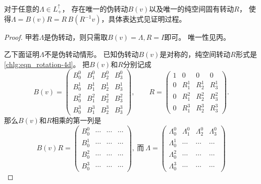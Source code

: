 \begin{theorem} 
    对于任意的$ \Lambda \in L^{\uparrow}_{+}$，
    存在唯一的伪转动$B(v)$以及唯一的纯空间固有转动$R$，
    使得$\Lambda = B(v) R = R\,B(R^{-1}v)$，具体表达式见证明过程。
\end{theorem}
\begin{proof}
    甲若$\Lambda$是伪转动，则只需取$B(v)=\Lambda,R=I$即可。
    唯一性见丙。

    乙下面证明$\Lambda$不是伪转动情形。
    已知伪转动$B(v)$是对称的，纯空间转动$R$形式是\eqref{chlg:eqn_rotation-4d}。
    把$B(v)$和$R$分别记成
    \begin{equation}
        B(v) = \begin{pmatrix}
            B^0_{0}  & B^0_{1} & B^0_{2} & B^0_{3} \\
            B^1_{0}  & B^1_{1} & B^1_{2} & B^1_{3} \\
            B^2_{0}  & B^2_{1} & B^2_{2} & B^2_{3} \\
            B^3_{0}  & B^3_{1} & B^3_{2} & B^3_{3}
        \end{pmatrix}, \qquad
        R = \begin{pmatrix}
            1    & 0 & 0 & 0 \\
            0 & R^1_{1} & R^1_{2} & R^1_{3} \\
            0 & R^2_{1} & R^2_{2} & R^2_{3} \\
            0 & R^3_{1} & R^3_{2} & R^3_{3}
        \end{pmatrix}.
    \end{equation}
    那么$B(v)$和$R$相乘的第一列是
    \begin{equation}\label{chlg:eqn_ld-tmp1}
        B(v)R=\begin{pmatrix}
            B^0_{0} & \cdots & \cdots& \cdots\\
            B^1_{0} & \cdots & \cdots& \cdots\\
            B^2_{0} & \cdots & \cdots& \cdots\\
            B^3_{0} & \cdots & \cdots& \cdots
        \end{pmatrix},\ \text{而}\
        \Lambda=\begin{pmatrix}
            \Lambda^0_{0} & \Lambda^0_{1} & \Lambda^0_{2}& \Lambda^0_{3}\\
            \Lambda^1_{0} & \cdots & \cdots& \cdots\\
            \Lambda^2_{0} & \cdots & \cdots& \cdots\\
            \Lambda^3_{0} & \cdots & \cdots& \cdots

\end{pmatrix}
\end{equation}
\end{proof}
